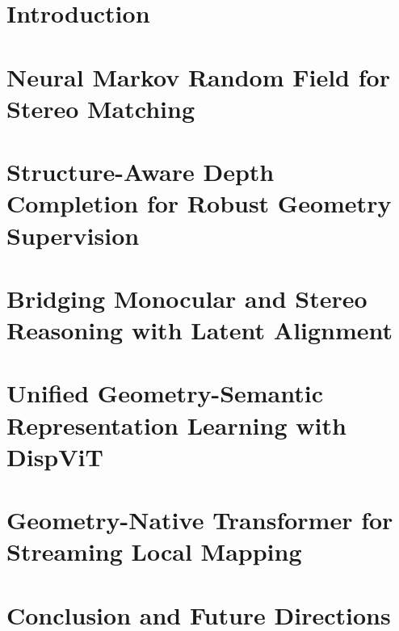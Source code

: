 \documentclass[11pt]{gsasthesis} %
\begin{document}
\chapter{Introduction}\label{ch:intro}


\chapter{Neural Markov Random Field for Stereo Matching}\label{ch:nmrf}


\chapter{Structure-Aware Depth Completion for Robust Geometry Supervision}\label{ch:pseudo-label}


\chapter{Bridging Monocular and Stereo Reasoning with Latent Alignment}\label{ch:bridgedepth}


\chapter{Unified Geometry-Semantic Representation Learning with DispViT}\label{ch:dispvit}


\chapter{Geometry-Native Transformer for Streaming Local Mapping}\label{ch:geont}


\chapter{Conclusion and Future Directions}\label{ch:conclusion}






\begin{singlespacing}
  \renewcommand{\bibname}{References}

  
  
\end{singlespacing}

%
\end{document}
